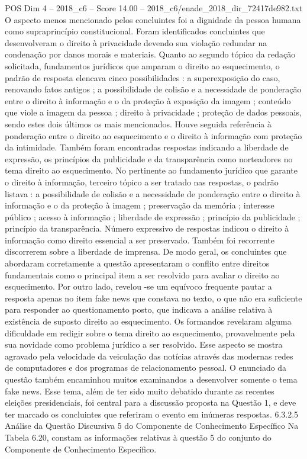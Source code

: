 \begin{textsample}{POS Dim 4 – 2018\_c6 – Score 14.00 – 2018\_c6/enade\_2018\_dir\_72417de982.txt}
O aspecto menos mencionado pelos concluintes foi a dignidade da pessoa humana como supraprincípio constitucional.
Foram identificados concluintes que desenvolveram o direito à privacidade devendo sua violação redundar na condenação por danos morais e materiais.
Quanto ao segundo tópico da redação solicitada, fundamentos jurídicos que amparam o direito ao esquecimento, o padrão de resposta elencava cinco possibilidades : a superexposição do caso, renovando fatos antigos ; a possibilidade de colisão e a necessidade de ponderação entre o direito à informação e o da proteção à exposição da imagem ; conteúdo que viole a imagem da pessoa ; direito à privacidade ; proteção de dados pessoais, sendo estes dois últimos os mais mencionados.
Houve seguida referência à ponderação entre o direito ao esquecimento e o direito à informação com proteção da intimidade.
Também foram encontradas respostas indicando a liberdade de expressão, os princípios da publicidade e da transparência como norteadores no tema direito ao esquecimento.
No pertinente ao fundamento jurídico que garante o direito à informação, terceiro tópico a ser tratado nas respostas, o padrão listava : a possibilidade de colisão e a necessidade de ponderação entre o direito à informação e o da proteção à imagem ; preservação da memória ; interesse público ; acesso à informação ; liberdade de expressão ; princípio da publicidade ; princípio da transparência.
Número expressivo de respostas indicou o direito à informação como direito essencial a ser preservado.
Também foi recorrente discorrerem sobre a liberdade de imprensa.
De modo geral, os concluintes que abordaram corretamente a questão apresentaram o conflito entre direitos fundamentais como o principal item a ser resolvido para avaliar o direito ao esquecimento.
Por outro lado, revelou -se um equívoco frequente pautar a resposta apenas no item fake news que constava no texto, o que não era suficiente para responder ao questionamento posto, que indicava a análise relativa à existência de suposto direito ao esquecimento.
Os formandos revelaram alguma dificuldade em redigir sobre o tema direito ao esquecimento, provavelmente pela sua novidade como problema jurídico a ser resolvido.
Esse aspecto se mostra agravado pela velocidade da veiculação das notícias através das modernas redes de computadores e dos programas de relacionamento pessoal.
O enunciado da questão também encaminhou muitos examinandos a desenvolver somente o tema fake news.
Esse tema, além de ter sido muito debatido durante as recentes eleições presidenciais, foi central para a discussão proposta na Questão 1, e deve ter marcado os concluintes que referiram o evento em inúmeras respostas. 6.3.2.5 Análise da Questão Discursiva 5 do Componente de Conhecimento Específico Na Tabela 6.20, constam as informações relativas à questão 5 do conjunto do Componente de Conhecimento Específico.

\end{textsample}
